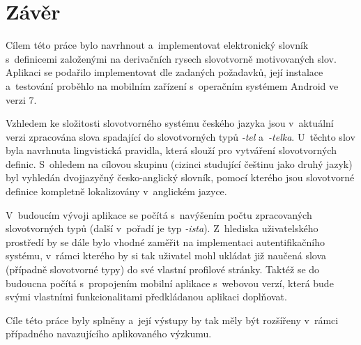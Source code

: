 \hypertarget{zuxe1vux11br}{%
\chapter*{Závěr}\label{zaver}
}

Cílem této práce bylo navrhnout a~implementovat elektronický slovník
s~definicemi založenými na derivačních rysech slovotvorně motivovaných
slov. Aplikaci se podařilo implementovat dle zadaných požadavků, její
instalace a~testování proběhlo na mobilním zařízení s~operačním systémem
Android ve verzi 7.

Vzhledem ke složitosti slovotvorného systému českého jazyka jsou
v~aktuální verzi zpracována slova spadající do slovotvorných typů
\emph{-tel} a~\emph{-telka}. U~těchto slov byla navrhnuta lingvistická
pravidla, která slouží pro vytváření slovotvorných definic. S~ohledem na
cílovou skupinu (cizinci studující češtinu jako druhý jazyk) byl
vyhledán dvojjazyčný česko-anglický slovník, pomocí kterého jsou
slovotvorné definice kompletně lokalizovány v~anglickém jazyce.

V~budoucím vývoji aplikace se počítá s~navýšením počtu zpracovaných
slovotvorných typů (další v~pořadí je typ \emph{-ista}). Z~hlediska
uživatelského prostředí by se dále bylo vhodné zaměřit na implementaci
autentifikačního systému, v~rámci kterého by si tak uživatel mohl
ukládat již naučená slova (případně slovotvorné typy) do své vlastní
profilové stránky. Taktéž se do budoucna počítá s~propojením mobilní
aplikace s~webovou verzí, která bude svými vlastními funkcionalitami
předkládanou aplikaci doplňovat.

Cíle této práce byly splněny a~její výstupy by tak měly být rozšířeny
v~rámci případného navazujícího aplikovaného výzkumu.
